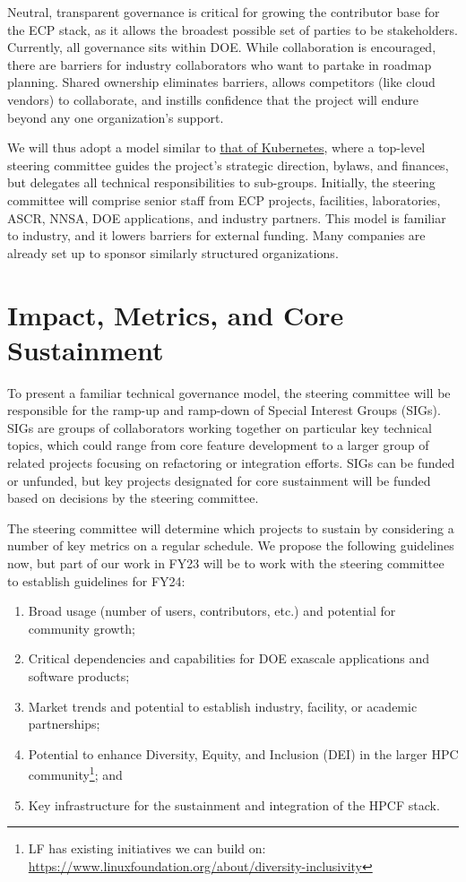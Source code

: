 \documentclass[11pt]{article}
\begin{document}
Neutral, transparent governance is critical for growing the contributor base for the ECP
stack, as it allows the broadest possible set of parties to be stakeholders. Currently,
all governance sits within DOE. While collaboration is encouraged, there are barriers
for industry collaborators who want to partake in roadmap planning. Shared ownership
eliminates barriers, allows competitors (like cloud vendors) to collaborate, and
instills confidence that the project will endure beyond any one organization's support.

We will thus adopt a model similar to
\href{https://github.com/kubernetes/steering/blob/main/charter.md}{that of Kubernetes},
where a top-level steering committee guides the project's strategic direction, bylaws,
and finances, but delegates all technical responsibilities to sub-groups. Initially, the
steering committee will comprise senior staff from ECP projects, facilities,
laboratories, ASCR, NNSA, DOE applications, and industry partners. This model is
familiar to industry, and it lowers barriers for external funding. Many companies are
already set up to sponsor similarly structured organizations.

\section{Impact, Metrics, and Core Sustainment}

To present a familiar technical governance model, the steering committee will be
responsible for the ramp-up and ramp-down of Special Interest Groups (SIGs). SIGs are
groups of collaborators working together on particular key technical topics, which could
range from core feature development to a larger group of related projects focusing on
refactoring or integration efforts. SIGs can be funded or unfunded, but key projects
designated for core sustainment will be funded based on decisions by the steering
committee.

The steering committee will determine which projects to sustain by considering a number
of key metrics on a regular schedule. We propose the following guidelines now, but part
of our work in FY23 will be to work with the steering committee to establish guidelines
for FY24:

\begin{enumerate}
\item Broad usage (number of users, contributors, etc.) and potential for community
  growth;
\item Critical dependencies and capabilities for DOE exascale applications and software
  products;
\item Market trends and potential to establish industry, facility, or academic
  partnerships;
\item Potential to enhance Diversity, Equity, and Inclusion (DEI) in the larger HPC
  community\footnote{LF has existing initiatives we can build on:
  \href{https://www.linuxfoundation.org/about/diversity-inclusivity}{https://www.linuxfoundation.org/about/diversity-inclusivity}};
  and
\item Key infrastructure for the sustainment and integration of the HPCF stack.
\end{enumerate}
\end{document}
